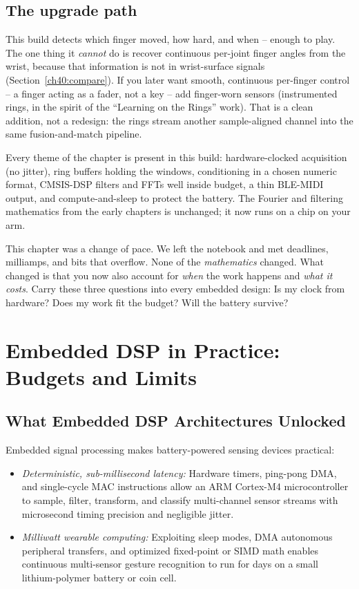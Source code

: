 \subsection{The upgrade path}

This build detects which finger moved, how hard, and when -- enough to play. The one thing it
\emph{cannot} do is recover continuous per-joint finger angles from the wrist, because that
information is not in wrist-surface signals (Section~\ref{ch40:compare}). If you later want smooth,
continuous per-finger control -- a finger acting as a fader, not a key -- add finger-worn sensors
(instrumented rings, in the spirit of the ``Learning on the Rings'' work). That is a clean addition,
not a redesign: the rings stream another sample-aligned channel into the same fusion-and-match
pipeline.

Every theme of the chapter is present in this build: hardware-clocked acquisition (no jitter), ring
buffers holding the windows, conditioning in a chosen numeric format, CMSIS-DSP filters and FFTs
well inside budget, a thin BLE-MIDI output, and compute-and-sleep to protect the battery. The
Fourier and filtering mathematics from the early chapters is unchanged; it now runs on a chip on your arm.

\begin{recoverybox}
This chapter was a change of pace. We left the
notebook and met deadlines, milliamps, and bits that overflow. None of
the \emph{mathematics} changed. What changed is that
you now also account for \emph{when} the work happens and \emph{what it costs}. Carry these three
questions into every embedded design: Is my clock from hardware? Does my work fit the budget? Will
the battery survive?
\end{recoverybox}

\section{Embedded DSP in Practice: Budgets and Limits}
\label{ch40:capabilities-limits}

\subsection{What Embedded DSP Architectures Unlocked}
Embedded signal processing makes battery-powered sensing devices practical:
\begin{itemize}
  \item \emph{Deterministic, sub-millisecond latency:} Hardware timers, ping-pong DMA, and single-cycle MAC instructions allow an ARM Cortex-M4 microcontroller to sample, filter, transform, and classify multi-channel sensor streams with microsecond timing precision and negligible jitter.
  \item \emph{Milliwatt wearable computing:} Exploiting sleep modes, DMA autonomous peripheral transfers, and optimized fixed-point or SIMD math enables continuous multi-sensor gesture recognition to run for days on a small lithium-polymer battery or coin cell.
\end{itemize}


